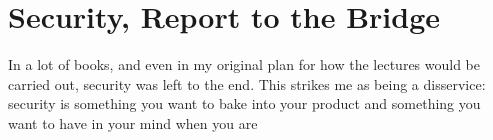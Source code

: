 




\section*{Security, Report to the Bridge}

In a lot of books, and even in my original plan for how the lectures would be carried out, security was left to the end. This strikes me as being a disservice: security is something you want to bake into your product and something you want to have in your mind when you are  

~\cite{fds}





